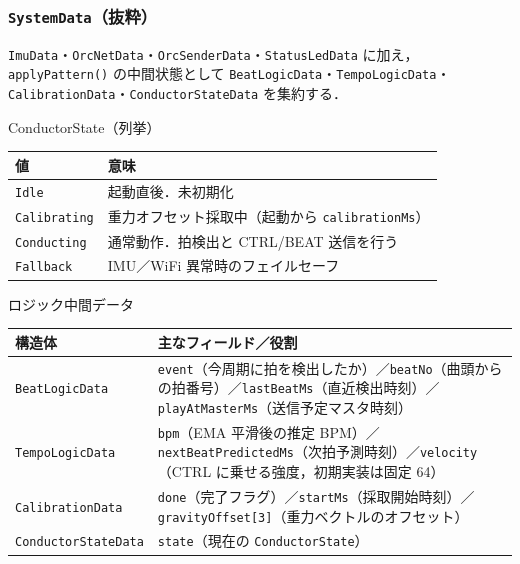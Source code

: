 \documentclass[lualatex,book,paper=a4paper,jafontsize=11.5pt,jafontscale=1.05]{jlreq}
\begin{document}
\subsubsection{\texttt{SystemData}（抜粋）}

\texttt{ImuData}・\texttt{OrcNetData}・\texttt{OrcSenderData}・\texttt{StatusLedData} に加え，
\texttt{applyPattern()} の中間状態として \texttt{BeatLogicData}・\texttt{TempoLogicData}・
\texttt{CalibrationData}・\texttt{ConductorStateData} を集約する．

\begin{apibox}{ConductorState（列挙）}
\begin{tabular}{l p{}}
\toprule
\textbf{値} & \textbf{意味} \\
\midrule
\texttt{Idle}        & 起動直後．未初期化 \\
\texttt{Calibrating} & 重力オフセット採取中（起動から \texttt{calibrationMs}） \\
\texttt{Conducting}  & 通常動作．拍検出と CTRL/BEAT 送信を行う \\
\texttt{Fallback}    & IMU／WiFi 異常時のフェイルセーフ \\
\bottomrule
\end{tabular}
\end{apibox}

\begin{apibox}{ロジック中間データ}
\begin{tabular}{l p{}}
\toprule
\textbf{構造体} & \textbf{主なフィールド／役割} \\
\midrule
\texttt{BeatLogicData}      & \texttt{event}（今周期に拍を検出したか）／\texttt{beatNo}（曲頭からの拍番号）／\texttt{lastBeatMs}（直近検出時刻）／\texttt{playAtMasterMs}（送信予定マスタ時刻） \\
\texttt{TempoLogicData}     & \texttt{bpm}（EMA 平滑後の推定 BPM）／\texttt{nextBeatPredictedMs}（次拍予測時刻）／\texttt{velocity}（CTRL に乗せる強度，初期実装は固定 64） \\
\texttt{CalibrationData}    & \texttt{done}（完了フラグ）／\texttt{startMs}（採取開始時刻）／\texttt{gravityOffset[3]}（重力ベクトルのオフセット） \\
\texttt{ConductorStateData} & \texttt{state}（現在の \texttt{ConductorState}） \\
\bottomrule
\end{tabular}
\end{apibox}
\end{document}
